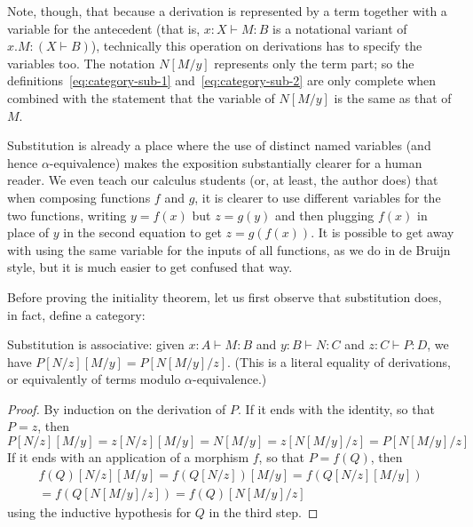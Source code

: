\documentclass{book}
\let\types\vdash
\begin{document}
Note, though, that because a derivation is represented by a term together with a variable for the antecedent (that is, $x:X\types M:B$ is a notational variant of $x.M:(X\types B)$), technically this operation on derivations has to specify the variables too.
The notation $N[M/y]$ represents only the term part; so the definitions~\eqref{eq:category-sub-1} and~\eqref{eq:category-sub-2} are only complete when combined with the statement that the variable of $N[M/y]$ is the same as that of $M$.

\begin{rmk}
  Substitution is already a place where the use of distinct named variables (and hence $\alpha$-equivalence) makes the exposition substantially clearer for a human reader.
  We even teach our calculus students (or, at least, the author does) that when composing functions $f$ and $g$, it is clearer to use different variables for the two functions, writing $y=f(x)$ but $z=g(y)$ and then plugging $f(x)$ in place of $y$ in the second equation to get $z = g(f(x))$.
  It is possible to get away with using the same variable for the inputs of all functions, as we do in de Bruijn style, but it is much easier to get confused that way.
\end{rmk}

Before proving the initiality theorem, let us first observe that substitution does, in fact, define a category:

\begin{lem}\label{thm:category-subassoc}
  Substitution is associative: given $x:A\types M:B$ and $y:B\types N:C$ and $z:C\types P:D$, we have $P[N/z][M/y] = P[N[M/y]/z]$.
  (This is a literal equality of derivations, or equivalently of terms modulo $\alpha$-equivalence.)
\end{lem}
\begin{proof}
  By induction on the derivation of $P$.
  If it ends with the identity, so that $P=z$, then
  \[P[N/z][M/y] = z[N/z][M/y] = N[M/y] = z[N[M/y]/z] = P[N[M/y]/z] \]
  If it ends with an application of a morphism $f$, so that $P = f(Q)$, then
  \begin{multline*}
    f(Q)[N/z][M/y] = f(Q[N/z])[M/y] = f(Q[N/z][M/y])\\
    = f(Q[N[M/y]/z]) = f(Q)[N[M/y]/z]
  \end{multline*}
  using the inductive hypothesis for $Q$ in the third step.
\end{proof}
\end{document}
